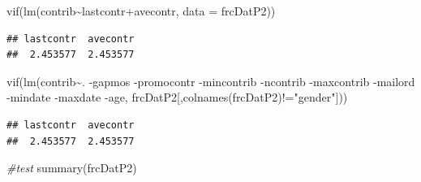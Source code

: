\documentclass[
]{article}
\newenvironment{Shaded}{\begin{snugshade}}{\end{snugshade}}
\newcommand{\AttributeTok}[1]{\textcolor[rgb]{0.77,0.63,0.00}{#1}}
\newcommand{\CommentTok}[1]{\textcolor[rgb]{0.56,0.35,0.01}{\textit{#1}}}
\newcommand{\FunctionTok}[1]{\textcolor[rgb]{0.00,0.00,0.00}{#1}}
\newcommand{\NormalTok}[1]{#1}
\newcommand{\SpecialCharTok}[1]{\textcolor[rgb]{0.00,0.00,0.00}{#1}}
\newcommand{\StringTok}[1]{\textcolor[rgb]{0.31,0.60,0.02}{#1}}
\begin{document}
\begin{Shaded}
\begin{Highlighting}[]
\FunctionTok{vif}\NormalTok{(}\FunctionTok{lm}\NormalTok{(contrib}\SpecialCharTok{\textasciitilde{}}\NormalTok{lastcontr}\SpecialCharTok{+}\NormalTok{avecontr, }\AttributeTok{data =}\NormalTok{ frcDatP2))}
\end{Highlighting}
\end{Shaded}

\begin{verbatim}
## lastcontr  avecontr 
##  2.453577  2.453577
\end{verbatim}

\begin{Shaded}
\begin{Highlighting}[]
\FunctionTok{vif}\NormalTok{(}\FunctionTok{lm}\NormalTok{(contrib}\SpecialCharTok{\textasciitilde{}}\NormalTok{.}
           \SpecialCharTok{{-}}\NormalTok{gapmos}
           \SpecialCharTok{{-}}\NormalTok{promocontr}
           \SpecialCharTok{{-}}\NormalTok{mincontrib}
           \SpecialCharTok{{-}}\NormalTok{ncontrib}
           \SpecialCharTok{{-}}\NormalTok{maxcontrib}
           \SpecialCharTok{{-}}\NormalTok{mailord}
           \SpecialCharTok{{-}}\NormalTok{mindate}
           \SpecialCharTok{{-}}\NormalTok{maxdate}
           \SpecialCharTok{{-}}\NormalTok{age,}
\NormalTok{           frcDatP2[,}\FunctionTok{colnames}\NormalTok{(frcDatP2)}\SpecialCharTok{!=}\StringTok{"gender"}\NormalTok{]))}
\end{Highlighting}
\end{Shaded}

\begin{verbatim}
## lastcontr  avecontr 
##  2.453577  2.453577
\end{verbatim}

\begin{Shaded}
\begin{Highlighting}[]
\CommentTok{\#test}
\FunctionTok{summary}\NormalTok{(frcDatP2)}
\end{Highlighting}
\end{Shaded}
\end{document}
